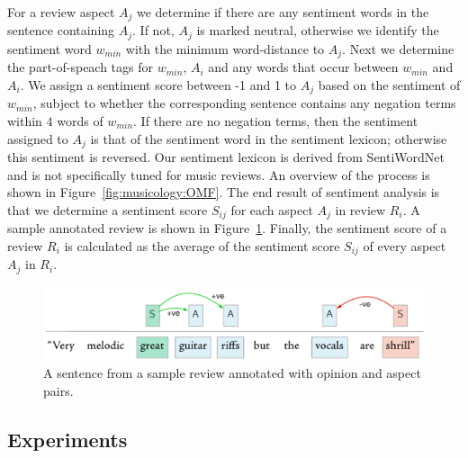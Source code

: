 For a review aspect $A_{j}$ we determine if there are any sentiment words in the sentence containing $A_{j}$. If not, $A_{j}$ is marked neutral, otherwise we identify the sentiment word $w_{min}$ with the minimum word-distance to $A_j$. Next we determine the part-of-speach tags for $w_{min}$, $A_i$ and any words that occur between $w_{min}$ and $A_i$. 
We assign a sentiment score between -1 and 1 to $A_j$ based on the sentiment of $w_{min}$, subject to whether the corresponding sentence contains any negation terms within $4$ words of $w_{min}$. If there are no negation terms, then the sentiment assigned to $A_j$ is that of the sentiment word in the sentiment lexicon; otherwise this sentiment is reversed. Our sentiment lexicon is derived from SentiWordNet \citep{esuli2006sentiwordnet} and is not specifically tuned for music reviews.
An overview of the process is shown in Figure~\ref{fig:musicology:OMF}. The end result of sentiment analysis is that we determine a sentiment score $S_{ij}$ for each aspect $A_j$ in review $R_i$. A sample annotated review is shown in Figure~\ref{fig:musicology:annotatedreview}.
Finally, the sentiment score of a review $R_i$ is calculated as the average of the sentiment score $S_{ij}$ of every aspect $A_j$ in $R_i$.

\begin{figure}[h]
\includegraphics[width=\columnwidth]{ch05_musicology_pics/annotation_sample2}
\caption{A sentence from a sample review annotated with opinion and aspect pairs.}
\label{fig:musicology:annotatedreview}
\end{figure}

\subsection{Experiments}
\label{sec:musicology:experiments}


